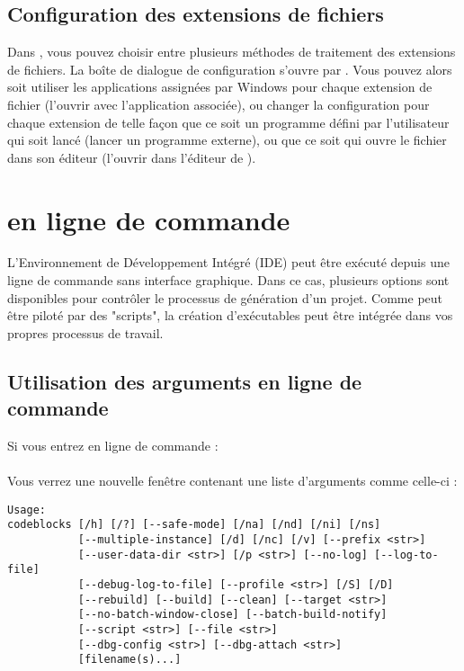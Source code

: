 \subsection{Configuration des extensions de fichiers}\label{sec:file_extension}

Dans \codeblocks, vous pouvez choisir entre plusieurs méthodes de traitement des extensions de fichiers. La boîte de dialogue de configuration s'ouvre par .
Vous pouvez alors soit utiliser les applications assignées par Windows pour chaque extension de fichier (l'ouvrir avec l'application associée), ou changer la configuration pour chaque extension de telle façon que ce soit un programme défini par l'utilisateur qui soit lancé (lancer un programme externe), ou que ce soit \codeblocks qui ouvre le fichier dans son éditeur (l'ouvrir dans l'éditeur de \codeblocks).


\section{\codeblocks en ligne de commande}

L'Environnement de Développement Intégré (IDE) \codeblocks peut être exécuté depuis une ligne de commande sans interface graphique. Dans ce cas, plusieurs options sont disponibles pour contrôler le processus de génération d'un projet. Comme \codeblocks peut être piloté par des "scripts", la création d'exécutables peut être intégrée dans vos propres processus de travail.

\subsection{Utilisation des arguments en ligne de commande}

Si vous entrez en ligne de commande :\\
\\
Vous verrez une nouvelle fenêtre contenant une liste d'arguments comme celle-ci :
\begin{lstlisting}
Usage:
codeblocks [/h] [/?] [--safe-mode] [/na] [/nd] [/ni] [/ns]
           [--multiple-instance] [/d] [/nc] [/v] [--prefix <str>]
           [--user-data-dir <str>] [/p <str>] [--no-log] [--log-to-file]
           [--debug-log-to-file] [--profile <str>] [/S] [/D]
           [--rebuild] [--build] [--clean] [--target <str>]
           [--no-batch-window-close] [--batch-build-notify]
           [--script <str>] [--file <str>]
           [--dbg-config <str>] [--dbg-attach <str>]
           [filename(s)...]
\end{lstlisting}

